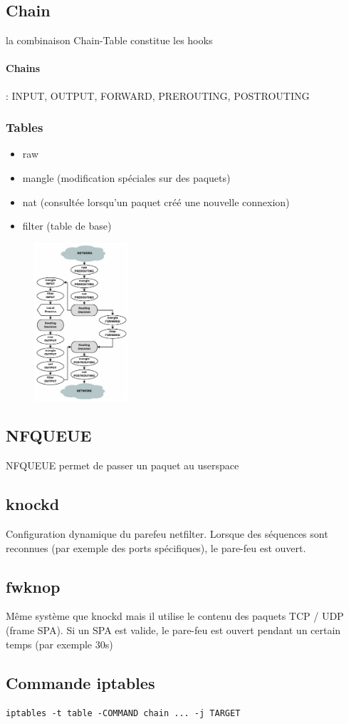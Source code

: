 \documentclass[resume]{subfiles}
\begin{document}
\subsection{Chain}
la combinaison Chain-Table constitue les hooks
\paragraph{Chains} : INPUT, OUTPUT, FORWARD, PREROUTING, POSTROUTING
\subsubsection{Tables}
\begin{itemize}
\item raw
\item mangle (modification spéciales sur des paquets)
\item nat (consultée lorsqu'un paquet créé une nouvelle connexion)
\item filter (table de base)
\end{itemize}
\begin{figure}[H]
\centering
\includegraphics[width=3.50cm]{img_8.png}
\end{figure}
\subsection{NFQUEUE}
NFQUEUE permet de passer un paquet au userspace
\subsection{knockd}
Configuration dynamique du parefeu netfilter. Lorsque des séquences sont reconnues (par exemple des ports spécifiques), le pare-feu est ouvert.
\subsection{fwknop}
Même système que knockd mais il utilise le contenu des paquets TCP / UDP (frame SPA). Si un SPA est valide, le pare-feu est ouvert pendant un certain temps (par exemple 30s)

\subsection{Commande iptables}
\begin{center}
\verb!iptables -t table -COMMAND chain ... -j TARGET!
\end{center}
\end{document}
